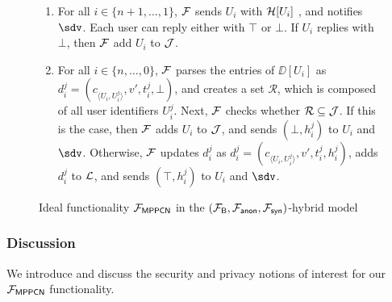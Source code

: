 \begin{figure*}[!t]
{{\begin{enumerate}
	\item For all $i \in \{n+1,\ldots,1\}$, $\mathcal{F}$ sends $U_i$ with $\mathcal{H}[U_i]$  , and notifies $\sdv$. Each user can reply either with 
	$\top$ or $\bot$. If $U_i$ replies with $\bot$, then $\mathcal{F}$ add $U_i$ to $\mathcal{J}$.
	
	\item For all $i \in \{n,\ldots,0\}$, $\mathcal{F}$ parses the entries of $\DD[U_i]$ as 
	$d_i^j = (c_{\langle U_i,U_i^j \rangle}, v', t_i^j, \bot)$, and creates a set 
	$\mathcal{R}$, which is composed of all user identifiers $U_i^j$. Next, $\mathcal{F}$ checks 
	whether $\mathcal{R} \subseteq \mathcal{J}$. If this is the case, then $\mathcal{F}$ adds $U_i$ to $\mathcal{J}$, 
	and sends $(\bot, h_i^j)$ to $U_i$ and $\sdv$. Otherwise, $\mathcal{F}$ updates $d_i^j$ as 
	$d_i^j = (c_{\langle U_i,U_i^j \rangle}, v', t_i^j, h_i^j)$, adds $d_i^j$ to $\mathcal{L}$, and 
	sends $(\top, h_i^j)$ to $U_i$ and $\sdv$.
\end{enumerate}
}}



\caption{Ideal functionality $\mathcal{F}_{\mathsf{MPPCN}}$ in the $(\mathcal{F}_{\mathsf{B}}, \mathcal{F}_{\mathsf{anon}}, 
\mathcal{F}_{\mathsf{syn}})$-hybrid model}
\label{fig:ideal-mppcn}
\end{figure*}

\subsubsection{Discussion}
\label{sec:mppcn-discussion}

We introduce and discuss the security and privacy notions of interest for our 
$\mathcal{F}_{\mathsf{MPPCN}}$ functionality.

